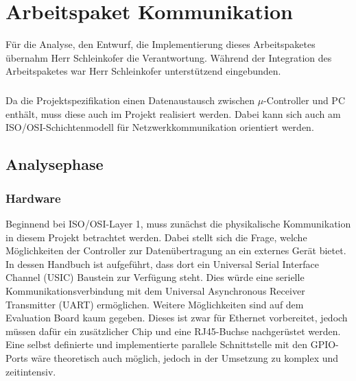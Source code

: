 \graphicspath{{./communication/}}
\chapter{Arbeitspaket Kommunikation}
Für die Analyse, den Entwurf, die Implementierung dieses Arbeitspaketes übernahm Herr Schleinkofer die Verantwortung. Während der Integration des Arbeitspaketes war Herr Schleinkofer unterstützend eingebunden.
\paragraph{}
Da die Projektspezifikation einen Datenaustausch zwischen $\mu$-Controller und PC enthält, muss diese auch im Projekt realisiert werden. Dabei kann sich auch am ISO/OSI-Schichtenmodell für Netzwerkkommunikation orientiert werden.
\section{Analysephase}
\subsection{Hardware}
Beginnend bei ISO/OSI-Layer 1, muss zunächst die physikalische Kommunikation in diesem Projekt betrachtet werden. 
Dabei stellt sich die Frage, welche Möglichkeiten der Controller zur Datenübertragung an ein externes Gerät bietet. In dessen Handbuch ist aufgeführt, dass dort ein Universal Serial Interface Channel (USIC) Baustein zur Verfügung steht. Dies würde eine serielle Kommunikationsverbindung mit dem Universal Asynchronous Receiver Transmitter (UART) ermöglichen. Weitere Möglichkeiten sind auf dem Evaluation Board kaum gegeben. Dieses ist zwar für Ethernet vorbereitet, jedoch müssen dafür ein zusätzlicher Chip und eine RJ45-Buchse nachgerüstet werden. Eine selbst definierte und implementierte parallele Schnittstelle mit den GPIO-Ports wäre theoretisch auch möglich, jedoch in der Umsetzung zu komplex und zeitintensiv.
